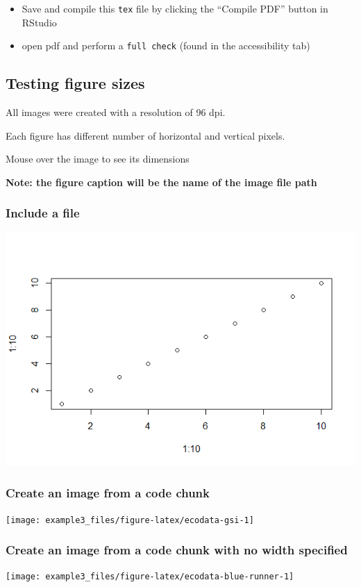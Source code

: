 \documentclass[
]{article}
\providecommand{\tightlist}{%
  \setlength{\itemsep}{0pt}\setlength{\parskip}{0pt}}
\begin{document}
\begin{itemize}
\tightlist
\item
  Save and compile this \texttt{tex} file by clicking the ``Compile
  PDF'' button in RStudio
\item
  open pdf and perform a \texttt{full\ check} (found in the
  accessibility tab)
\end{itemize}

\subsection{Testing figure sizes}\label{testing-figure-sizes}

All images were created with a resolution of 96 dpi.

Each figure has different number of horizontal and vertical pixels.

Mouse over the image to see its dimensions

\textbf{Note: the figure caption will be the name of the image file
path}

\subsubsection{Include a file}\label{include-a-file}

\includegraphics[width=600px]{figures/test6}

\subsubsection{Create an image from a code
chunk}\label{create-an-image-from-a-code-chunk}

\texttt{[image: example3\_files/figure-latex/ecodata-gsi-1]}

\subsubsection{Create an image from a code chunk with no width
specified}\label{create-an-image-from-a-code-chunk-with-no-width-specified}

\texttt{[image: example3\_files/figure-latex/ecodata-blue-runner-1]}
\end{document}
